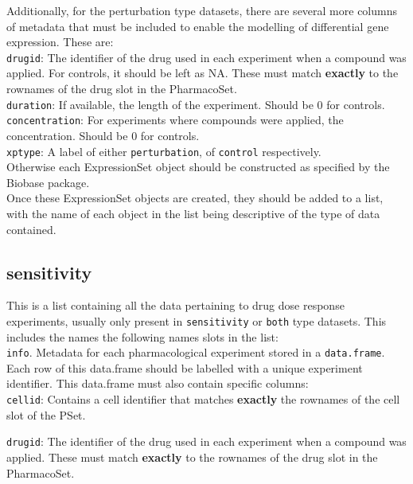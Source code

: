 \documentclass[11pt]{article}
\begin{document}
Additionally, for the perturbation type datasets, there are several more columns of metadata that must be included to enable the modelling of differential gene expression. These are:\\

\texttt{drugid}: The identifier of the drug used in each experiment when a compound was applied. For controls, it should be left as NA. These must match \textbf{exactly} to the rownames of the drug slot in the PharmacoSet.\\
\texttt{duration}: If available, the length of the experiment. Should be 0 for controls.\\
\texttt{concentration}: For experiments where compounds were applied, the concentration. Should be 0 for controls. \\
\texttt{xptype}: A label of either \texttt{perturbation}, of \texttt{control} respectively.\\

Otherwise each ExpressionSet object should be constructed as specified by the Biobase package. \\

Once these ExpressionSet objects are created, they should be added to a list, with the name of each object in the list being descriptive of the type of data contained. 

\subsection{sensitivity}
This is a list containing all the data pertaining to drug dose response experiments, usually only present in \texttt{sensitivity} or \texttt{both} type datasets. This includes the names the following names slots in the list:\\

\texttt{info}. Metadata for each pharmacological experiment stored in a \texttt{data.frame}. Each row of this data.frame should be labelled with a unique experiment identifier. This data.frame must also contain specific columns: \\

\texttt{cellid}: Contains a cell identifier that matches \textbf{exactly} the rownames of the cell slot of the PSet.

\texttt{drugid}: The identifier of the drug used in each experiment when a compound was applied. These must match \textbf{exactly} to the rownames of the drug slot in the PharmacoSet.\\
\end{document}
